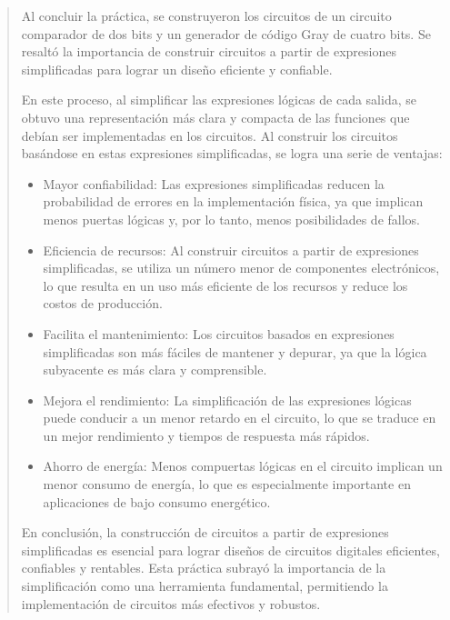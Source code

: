 \documentclass[a4paper,12pt]{article}
\begin{document}
\begin{quotation}
	Al concluir la práctica, se construyeron los circuitos de un circuito comparador de dos bits y un generador de código Gray de cuatro bits. Se resaltó la importancia de construir circuitos a partir de expresiones simplificadas para lograr un diseño eficiente y confiable.\par

	En este proceso, al simplificar las expresiones lógicas de cada salida, se obtuvo una representación más clara y compacta de las funciones que debían ser implementadas en los circuitos. Al construir los circuitos basándose en estas expresiones simplificadas, se logra una serie de ventajas:\par

	\begin{itemize}
		\item Mayor confiabilidad: Las expresiones simplificadas reducen la probabilidad de errores en la implementación física, ya que implican menos puertas lógicas y, por lo tanto, menos posibilidades de fallos.
		\item Eficiencia de recursos: Al construir circuitos a partir de expresiones simplificadas, se utiliza un número menor de componentes electrónicos, lo que resulta en un uso más eficiente de los recursos y reduce los costos de producción.
		\item Facilita el mantenimiento: Los circuitos basados en expresiones simplificadas son más fáciles de mantener y depurar, ya que la lógica subyacente es más clara y comprensible.
		\item Mejora el rendimiento: La simplificación de las expresiones lógicas puede conducir a un menor retardo en el circuito, lo que se traduce en un mejor rendimiento y tiempos de respuesta más rápidos.
		\item Ahorro de energía: Menos compuertas lógicas en el circuito implican un menor consumo de energía, lo que es especialmente importante en aplicaciones de bajo consumo energético.
	\end{itemize}

	En conclusión, la construcción de circuitos a partir de expresiones simplificadas es esencial para lograr diseños de circuitos digitales eficientes, confiables y rentables. Esta práctica subrayó la importancia de la simplificación como una herramienta fundamental, permitiendo la implementación de circuitos más efectivos y robustos.\par
\end{quotation}
\end{document}
